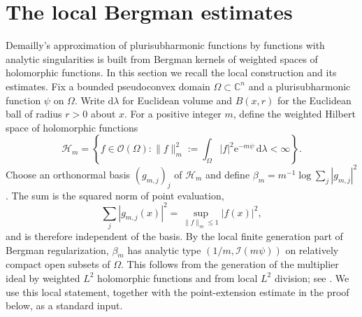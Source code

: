 \section{The local Bergman estimates}

Demailly's approximation of plurisubharmonic functions by functions with analytic singularities is built from Bergman kernels of weighted spaces of holomorphic functions. In this section we recall the local construction and its estimates. Fix a bounded pseudoconvex domain $\Omega\subset\mathbb C^n$ and a plurisubharmonic function $\psi$ on $\Omega$. Write $\mathrm{d}\lambda$ for Euclidean volume and $B(x,r)$ for the Euclidean ball of radius $r>0$ about $x$. For a positive integer $m$, define the weighted Hilbert space of holomorphic functions
\[
 \mathcal H_m=\left\{f\in\mathcal O(\Omega):
          \|f\|_m^2:=\int_\Omega|f|^2\mathrm{e}^{-m\psi}\,\mathrm{d}\lambda<\infty\right\}.
\]
Choose an orthonormal basis $(g_{m,j})_j$ of $\mathcal H_m$ and define $\beta_m=m^{-1}\log\sum_j|g_{m,j}|^2$. The sum is the squared norm of point evaluation,
\[
 \sum_j|g_{m,j}(x)|^2
   =\sup_{\|f\|_m\leq1}|f(x)|^2,
\]
and is therefore independent of the basis. By the local finite generation part of Bergman regularization, $\beta_m$ has analytic type $(1/m,\mathcal I(m\psi))$ on relatively compact open subsets of $\Omega$. This follows from the generation of the multiplier ideal by weighted $L^2$ holomorphic functions and from local $L^2$ division; see \cite[Proposition 5.7 and Section 14.A]{DemAM11}. We use this local statement, together with the point-extension estimate in the proof below, as a standard input.

